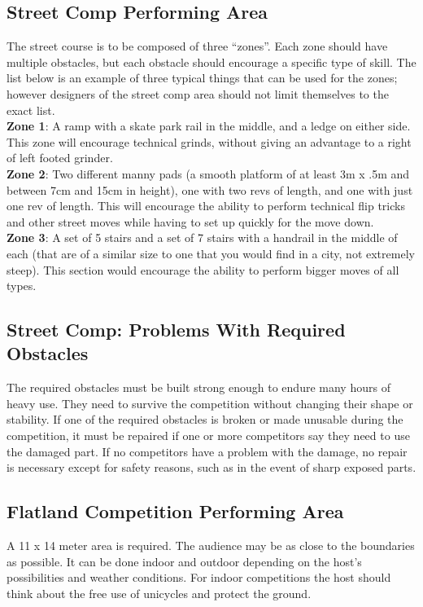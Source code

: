 \subsection{Street Comp Performing Area}
The street course is to be composed of three “zones”. Each zone should have multiple obstacles, but each obstacle
should encourage a specific type of skill. The list below is an example of three typical things that can be used for the
zones; however designers of the street comp area should not limit themselves to the exact list.\\
\newpage
\textbf{Zone 1}: A ramp with a skate park rail in the middle, and a ledge on either side. This zone will encourage technical
grinds, without giving an advantage to a right of left footed grinder.\\
\textbf{Zone 2}: Two different manny pads (a smooth platform of at least 3m x .5m and between 7cm and 15cm in height), one with two revs of length, and one with just one rev of length. This will encourage the ability to perform technical flip tricks and other street moves while having to set up quickly for the move down.\\
\textbf{Zone 3}: A set of 5 stairs and a set of 7 stairs with a handrail in the middle of each (that are of a similar size to one that you would find in a city, not extremely steep). This section would encourage the ability to perform bigger moves of all types.

\subsection{Street Comp: Problems With Required Obstacles}
The required obstacles must be built strong enough to endure many hours of heavy use. They need to survive the competition without changing their shape or stability. If one of the required obstacles is broken or made unusable during the competition, it must be repaired if one or more competitors say they need to use the damaged part. If no competitors have a problem with the damage, no repair is necessary except for safety reasons, such as in the event of sharp exposed parts. 

\subsection{Flatland Competition Performing Area}
A 11 x 14 meter area is required. The audience may be as close to the boundaries as possible. It can be done indoor and outdoor depending on the host's possibilities and weather conditions. For indoor competitions the host should think about the free use of unicycles and protect the ground. 

